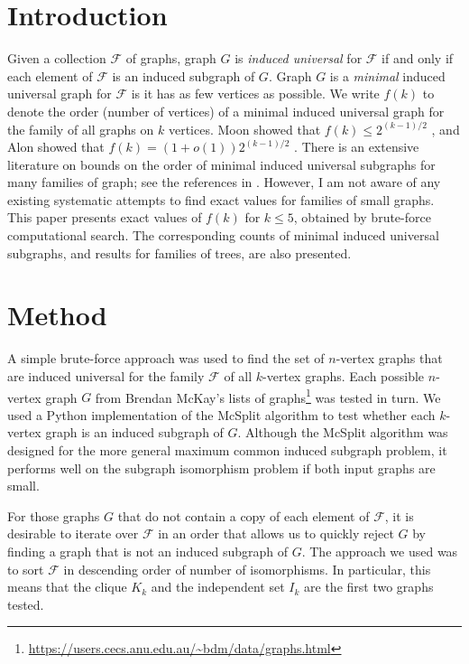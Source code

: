 \documentclass[12pt]{article}
\begin{document}
\newcommand{\calF}{\ensuremath{\mathcal{F}}}

\maketitle
%
\section{Introduction}

Given a collection $\calF$ of graphs, graph $G$ is \emph{induced
universal} for $\calF$ if and only if each element of $\calF$ is an induced
subgraph of $G$.  Graph $G$ is a \emph{minimal} induced universal graph
for $\calF$ is it has as few vertices as possible.  We write $f(k)$ to denote
    the order (number of vertices) of a minimal induced universal graph for the
    family of all graphs on $k$ vertices.  Moon showed that $f(k) \leq 2^{(k-1)/2}$
    \cite{moon_1965}, and Alon showed that $f(k) = (1 + o(1))2^{(k-1)/2}$
    \cite{alon2017asymptotically}.  There is an extensive literature on bounds
    on the order of minimal induced universal subgraphs for many families of
    graph; see the references in \cite{alon2017asymptotically}.  However, I am
    not aware of any existing systematic attempts to find exact values for
    families of small graphs.  This paper presents exact values of $f(k)$ for
    $k \leq 5$, obtained by brute-force computational search.  The
    corresponding counts of minimal induced universal subgraphs, and results for
    families of trees, are also
    presented.

\section{Method}

A simple brute-force approach was used to find the set of
$n$-vertex graphs that are induced universal for the family $\calF$ of all $k$-vertex
graphs.  Each possible $n$-vertex graph $G$ from Brendan McKay's lists of
graphs\footnote{\url{https://users.cecs.anu.edu.au/~bdm/data/graphs.html}} was
tested in turn.  We used a Python implementation of the McSplit
algorithm \cite{DBLP:conf/ijcai/McCreeshPT17} to test whether each $k$-vertex
graph is an induced subgraph of $G$.  Although the McSplit algorithm was designed for
the more general maximum common induced subgraph problem, it performs well on
the subgraph isomorphism problem if both input graphs are small.

For those graphs $G$ that do not contain a copy of each element of $\calF$, it
is desirable to iterate over $\calF$ in an order that allows us to quickly
reject $G$ by finding a graph that is not an induced subgraph of $G$.  The approach we
used was to sort $\calF$ in descending order of number of isomorphisms.  In
particular, this means that the clique $K_k$ and the independent set $I_k$ are
the first two graphs tested.
\end{document}
